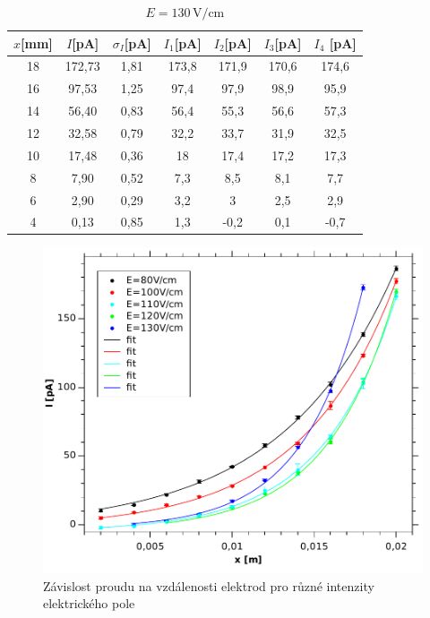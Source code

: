 \documentclass[12pt]{article}
\begin{document}
\begin{table}[htbp]
\begin{center}
\begin{tabular}{|c|c|c|c|c|c|c|}
\hline
$x$[mm] & $I$[pA] & $\sigma_I$[pA] & $I_1$[pA] & $I_2$[pA] & $I_3$[pA] & $I_4$ [pA] \\ \hline
18 & 172,73 & 1,81 & 173,8 & 171,9 & 170,6 & 174,6 \\ \hline
16 & 97,53 & 1,25 & 97,4 & 97,9 & 98,9 & 95,9 \\ \hline
14 & 56,40 & 0,83 & 56,4 & 55,3 & 56,6 & 57,3 \\ \hline
12 & 32,58 & 0,79 & 32,2 & 33,7 & 31,9 & 32,5 \\ \hline
10 & 17,48 & 0,36 & 18 & 17,4 & 17,2 & 17,3 \\ \hline
8 & 7,90 & 0,52 & 7,3 & 8,5 & 8,1 & 7,7 \\ \hline
6 & 2,90 & 0,29 & 3,2 & 3 & 2,5 & 2,9 \\ \hline
4 & 0,13 & 0,85 & 1,3 & -0,2 & 0,1 & -0,7 \\ \hline
\end{tabular}
\caption{$E = 130\,\mathrm{V/cm}$}
\label{t130}
\end{center}
\end{table}

\begin{figure}[htbp]
\begin{center}
\includegraphics[width=12cm]{Graph1.pdf}
\caption{Závislost proudu na vzdálenosti elektrod pro různé intenzity elektrického pole}
\end{center}
\label{i=fx}
\end{figure}
\end{document}
